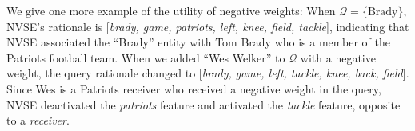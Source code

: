 \documentclass[a4paper]{article}
\newcommand{\figref}[1]{Figure~\ref{#1}}
\newcommand{\appref}[1]{(Appendix~\ref{#1})}
\newcommand{\cD}{\mathcal{Q}}
\newcommand{\cQ}{\mathcal{Q}}
\newcommand{\rV}{\mathrm{V}}
\DeclareMathOperator{\NN}{NN}
\newcommand{\gennn}{\NN^{(g)}_\theta}
\newcommand{\cS}{\mathcal{S}}
\newcommand{\nvge}{NVSE\xspace}
\begin{document}
We give one more example of the utility of negative weights:
When $\cQ = \{\text{Brady}\}$, \nvge's rationale is 
[\textit{brady, game, patriots, left, knee, field, tackle}], 
indicating that \nvge associated the ``Brady'' entity with Tom Brady who is a member of the Patriots football team. When we added ``Wes Welker'' to $\cQ$ with a negative weight, the query rationale changed to
[\textit{brady, game, left, tackle, knee, back, field}]. Since Wes
is a Patriots receiver who received a negative weight in the query, \nvge deactivated the \textit{patriots} feature and activated the \textit{tackle} feature, opposite to a \textit{receiver}.


\end{document}
